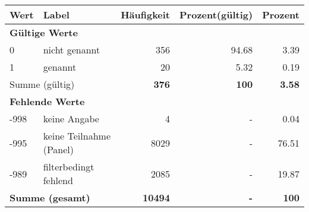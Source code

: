      \begin{longtable}{lXrrr}
     \toprule
     \textbf{Wert} & \textbf{Label} & \textbf{Häufigkeit} & \textbf{Prozent(gültig)} & \textbf{Prozent} \\
     \endhead
     \midrule
     \multicolumn{5}{l}{\textbf{Gültige Werte}}\\

     0 &
     \multicolumn{1}{X}{ nicht genannt   } &


       \num{356} &
       \num[round-mode=places,round-precision=2]{94.68} &
         \num[round-mode=places,round-precision=2]{3.39} \\

     1 &
     \multicolumn{1}{X}{ genannt   } &


       \num{20} &
       \num[round-mode=places,round-precision=2]{5.32} &
         \num[round-mode=places,round-precision=2]{0.19} \\
     \midrule
     \multicolumn{2}{l}{Summe (gültig)} &
       \textbf{\num{376}} &
     \textbf{\num{100}} &
       \textbf{\num[round-mode=places,round-precision=2]{3.58}} \\
     \multicolumn{5}{l}{\textbf{Fehlende Werte}}\\
       -998 &
       keine Angabe &
         \num{4} &
        - &
         \num[round-mode=places,round-precision=2]{0.04} \\
       -995 &
       keine Teilnahme (Panel) &
         \num{8029} &
        - &
         \num[round-mode=places,round-precision=2]{76.51} \\
       -989 &
       filterbedingt fehlend &
         \num{2085} &
        - &
         \num[round-mode=places,round-precision=2]{19.87} \\
     \midrule
     \multicolumn{2}{l}{\textbf{Summe (gesamt)}} &
          \textbf{\num{10494}} &
        \textbf{-} &
        \textbf{\num{100}} \\
     \bottomrule
     \end{longtable}
     
